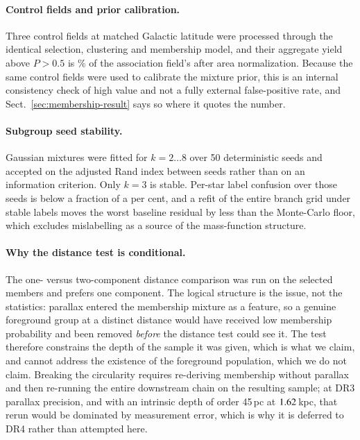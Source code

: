 \documentclass{aa}
\begin{document}
\paragraph{Control fields and prior calibration.}
Three control fields at matched Galactic latitude were processed through the
identical selection, clustering and membership model, and their aggregate yield
above $P > 0.5$ is \controlYield\% of the association field's after area
normalization. Because the same control fields were used to calibrate the
mixture prior, this is an internal consistency check of high value and not a
fully external false-positive rate, and Sect.~\ref{sec:membership-result} says
so where it quotes the number.

\paragraph{Subgroup seed stability.}
Gaussian mixtures were fitted for $k = 2\ldots8$ over 50 deterministic seeds and
accepted on the adjusted Rand index between seeds rather than on an information
criterion. Only $k = 3$ is stable. Per-star label confusion over those seeds is
below a fraction of a per cent, and a refit of the entire branch grid under
stable labels moves the worst baseline residual by less than the Monte-Carlo
floor, which excludes mislabelling as a source of the mass-function structure.

\paragraph{Why the distance test is conditional.}
The one- versus two-component distance comparison was run on the selected
members and prefers one component. The logical structure is the issue, not the
statistics: parallax entered the membership mixture as a feature, so a genuine
foreground group at a distinct distance would have received low membership
probability and been removed \emph{before} the distance test could see it. The
test therefore constrains the depth of the sample it was given, which is what we
claim, and cannot address the existence of the foreground population, which we
do not claim. Breaking the circularity requires re-deriving membership without
parallax and then re-running the entire downstream chain on the resulting
sample; at DR3 parallax precision, and with an intrinsic depth of order 45\,pc
at $1.62$\,kpc, that rerun would be dominated by measurement error, which
is why it is deferred to DR4 rather than attempted here.
\end{document}

